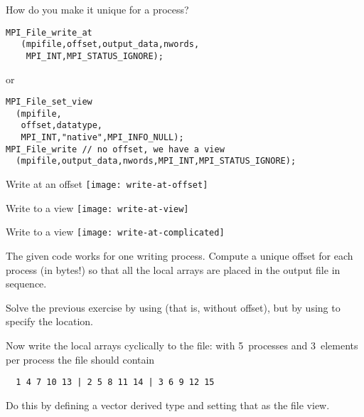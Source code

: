 \begin{numberedframe}{How do you make it unique for a process?}
\lstset{language=C}
\begin{lstlisting}
MPI_File_write_at
   (mpifile,offset,output_data,nwords,
    MPI_INT,MPI_STATUS_IGNORE);
\end{lstlisting}
or
\begin{lstlisting}
MPI_File_set_view
  (mpifile,
   offset,datatype,
   MPI_INT,"native",MPI_INFO_NULL);
MPI_File_write // no offset, we have a view
  (mpifile,output_data,nwords,MPI_INT,MPI_STATUS_IGNORE);
\end{lstlisting}
\end{numberedframe}

\begin{numberedframe}{Write at an offset}
  \texttt{[image: write-at-offset]}
\end{numberedframe}

\begin{numberedframe}{Write to a view}
  \texttt{[image: write-at-view]}
\end{numberedframe}

\begin{numberedframe}{Write to a view}
  \texttt{[image: write-at-complicated]}
\end{numberedframe}

\begin{exerciseframe}[blockwrite]
  The given code works for one writing process. Compute a unique
  offset for each process (in bytes!) so that all the local arrays are
  placed in the output file in sequence.
\end{exerciseframe}

\begin{exerciseframe}[viewwrite]
  Solve the previous exercise by using  (that is,
  without offset), but by using  to specify the location.
\end{exerciseframe}

\begin{exerciseframe}[scatterwrite]
  Now write the local arrays cyclically to the file: with 5~processes
  and 3~elements per process the file should contain
\begin{verbatim}
  1 4 7 10 13 | 2 5 8 11 14 | 3 6 9 12 15
\end{verbatim}
  Do this by defining a vector derived type and setting that as the
  file view.
\end{exerciseframe}

\endinput

\begin{numberedframe}{}
\begin{verbatim}

\end{verbatim}
\end{numberedframe}

